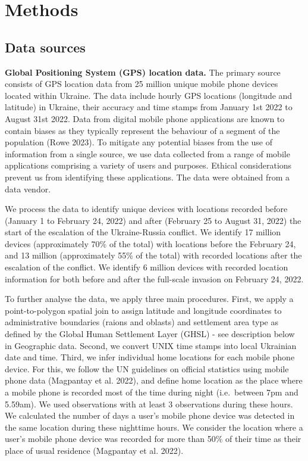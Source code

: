 \documentclass[
  sn-nature,
  11pt,
]{sn-jnl}
\begin{document}
\section{Methods}\label{methods}

\subsection{Data sources}\label{sec-data-sources}

\textbf{Global Positioning System (GPS) location data.} The primary
source consists of GPS location data from 25 million unique mobile phone
devices located within Ukraine. The data include hourly GPS locations
(longitude and latitude) in Ukraine, their accuracy and time stamps from
January 1st 2022 to August 31st 2022. Data from digital mobile phone
applications are known to contain biases as they typically represent the
behaviour of a segment of the population (Rowe 2023). To mitigate any
potential biases from the use of information from a single source, we
use data collected from a range of mobile applications comprising a
variety of users and purposes. Ethical considerations prevent us from
identifying these applications. The data were obtained from a data
vendor.

We process the data to identify unique devices with locations recorded
before (January 1 to February 24, 2022) and after (February 25 to August
31, 2022) the start of the escalation of the Ukraine-Russia conflict. We
identify 17 million devices (approximately 70\% of the total) with
locations before the February 24, and 13 million (approximately 55\% of
the total) with recorded locations after the escalation of the conflict.
We identify 6 million devices with recorded location information for
both before and after the full-scale invasion on February 24, 2022.

To further analyse the data, we apply three main procedures. First, we
apply a point-to-polygon spatial join to assign latitude and longitude
coordinates to administrative boundaries (raions and oblasts) and
settlement area type as defined by the Global Human Settlement Layer
(GHSL) - see description below in Geographic data. Second, we convert
UNIX time stamps into local Ukrainian date and time. Third, we infer
individual home locations for each mobile phone device. For this, we
follow the UN guidelines on official statistics using mobile phone data
(Magpantay et al. 2022), and define home location as the place where a
mobile phone is recorded most of the time during night (i.e.~between 7pm
and 5.59am). We used observations with at least 3 observations during
these hours. We calculated the number of days a user's mobile phone
device was detected in the same location during these nighttime hours.
We consider the location where a user's mobile phone device was recorded
for more than 50\% of their time as their place of usual residence
(Magpantay et al. 2022).
\end{document}
